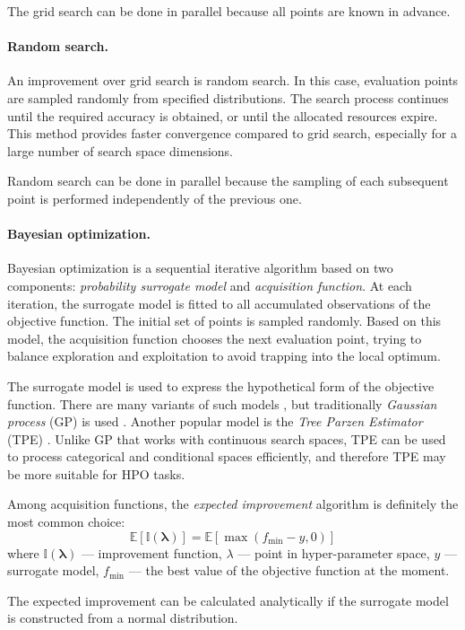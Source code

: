 \documentclass[reprint,
superscriptaddress,
amsmath,amssymb,aps,showkeys,showpacs,
twoside,final,secnumarabic,%
nofootinbib]{revtex4-2}
\begin{document}
The grid search can be done in parallel because all points are known in advance.

\paragraph*{Random search.}
An improvement over grid search is random search. In this case, evaluation points are sampled randomly from specified distributions. The search process continues until the required accuracy is obtained, or until the allocated resources expire. This method provides faster convergence compared to grid search, especially for a large number of search space dimensions.

Random search can be done in parallel because the sampling of each subsequent point is performed independently of the previous one.

\paragraph*{Bayesian optimization.}
Bayesian optimization is a sequential iterative algorithm based on two components: \textit{probability surrogate model} and \textit{acquisition function}. At each iteration, the surrogate model is fitted to all accumulated observations of the objective function. The initial set of points is sampled randomly. Based on this model, the acquisition function chooses the next evaluation point, trying to balance exploration and exploitation to avoid trapping into the local optimum.

The surrogate model is used to express the hypothetical form of the objective function. There are many variants of such models \cite{bib21}, but traditionally \textit{Gaussian process} (GP) is used \cite{bib22}. Another popular model is the \textit{Tree Parzen Estimator} (TPE) \cite{bib23}. Unlike GP that works with continuous search spaces, TPE can be used to process categorical and conditional spaces efficiently, and therefore TPE may be more suitable for HPO tasks.

Among acquisition functions, the \textit{expected improvement} algorithm \cite{bib24} is definitely the most common choice:
\[\mathbb{E}[\mathbb{I}(\mathbf{\lambda})] = \mathbb{E}[\max(f_{\min} - y, 0)]\]
where $\mathbb{I}(\mathbf{\lambda})$ — improvement function, $\lambda$ — point in hyper-parameter space, $y$ — surrogate model, $f_{\min}$ — the best value of the objective function at the moment.

The expected improvement can be calculated analytically if the surrogate model is constructed from a normal distribution.
\end{document}
